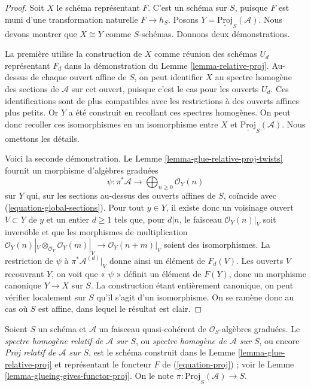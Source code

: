\begin{proof}
Soit $X$ le schéma représentant $F$. C'est un schéma sur $S$, puisque $F$
est muni d'une transformation naturelle $F \to h_S$.
Posons $Y = \underline{\text{Proj}}_S(\mathcal{A})$. Nous devons montrer
que $X \cong Y$ comme $S$-schémas. Donnons deux démonstrations.

\medskip\noindent
La première utilise la construction de $X$ comme réunion des schémas $U_d$
représentant $F_d$ dans la démonstration du Lemme \ref{lemma-relative-proj}.
Au-dessus de chaque ouvert affine de $S$, on peut identifier $X$ au spectre
homogène des sections de $\mathcal{A}$ sur cet ouvert, puisque c'est le cas
pour les ouverts $U_d$. Ces identifications sont de plus compatibles avec
les restrictions à des ouverts affines plus petits. Or $Y$ a été construit
en recollant ces spectres homogènes. On peut donc recoller ces isomorphismes
en un isomorphisme entre $X$ et $\underline{\text{Proj}}_S(\mathcal{A})$.
Nous omettons les détails.

\medskip\noindent
Voici la seconde démonstration. Le
Lemme \ref{lemma-glue-relative-proj-twists} fournit un morphisme d'algèbres
graduées
$$
\psi : \pi^*\mathcal{A}
\longrightarrow
\bigoplus\nolimits_{n \geq 0} \mathcal{O}_Y(n)
$$
sur $Y$ qui, sur les sections au-dessus des ouverts affines de $S$, coïncide
avec (\ref{equation-global-sections}). Pour tout $y \in Y$, il existe donc
un voisinage ouvert $V \subset Y$ de $y$ et un entier $d \geq 1$ tels que,
pour $d | n$, le faisceau $\mathcal{O}_Y(n)|_V$ soit inversible et que les
morphismes de multiplication
$\mathcal{O}_Y(n)|_V \otimes_{\mathcal{O}_V} \mathcal{O}_Y(m)|_V
\to \mathcal{O}_Y(n + m)|_V$ soient des isomorphismes.
La restriction de $\psi$ à $\pi^*\mathcal{A}^{(d)}|_V$ donne ainsi un
élément de $F_d(V)$. Les ouverts $V$ recouvrant $Y$, on voit que « $\psi$ »
définit un élément de $F(Y)$, donc un morphisme canonique $Y \to X$ sur $S$.
La construction étant entièrement canonique, on peut vérifier localement
sur $S$ qu'il s'agit d'un isomorphisme. On se ramène donc au cas où $S$ est
affine, dans lequel le résultat est clair.
\end{proof}

\begin{definition}
\label{definition-relative-proj}
Soient $S$ un schéma et $\mathcal{A}$ un faisceau quasi-cohérent de
$\mathcal{O}_S$-algèbres graduées. Le {\it spectre homogène relatif de
$\mathcal{A}$ sur $S$}, ou {\it spectre homogène de $\mathcal{A}$ sur $S$},
ou encore {\it Proj relatif de $\mathcal{A}$ sur $S$}, est le schéma
construit dans le Lemme \ref{lemma-glue-relative-proj} et représentant le
foncteur $F$ de (\ref{equation-proj}) ; voir le
Lemme \ref{lemma-glueing-gives-functor-proj}.
On le note $\pi : \underline{\text{Proj}}_S(\mathcal{A}) \to S$.
\end{definition}

